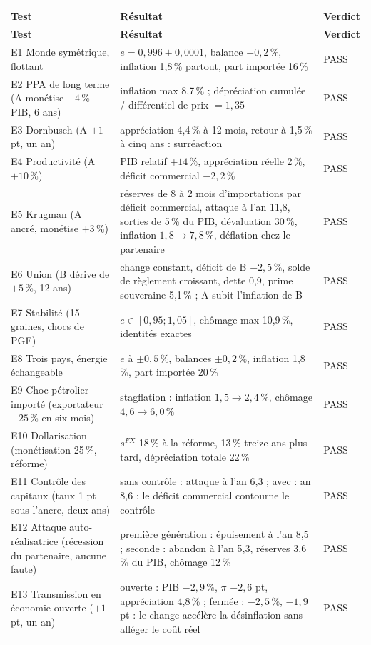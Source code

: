 \documentclass[11pt,a4paper]{article}
\begin{document}
\begin{center}\small
\begin{longtable}{p{4.4cm}p{8.0cm}p{1.4cm}}
\toprule
\textbf{Test} & \textbf{Résultat} & \textbf{Verdict}\\
\midrule
\endfirsthead
\toprule
\textbf{Test} & \textbf{Résultat} & \textbf{Verdict}\\
\midrule
\endhead
E1 Monde symétrique, flottant & $e=0{,}996\pm0{,}0001$, balance $-0{,}2\,\%$, inflation 1,8\,\% partout, part importée 16\,\% & PASS\\
E2 PPA de long terme (A monétise $+4\,\%$ PIB, 6 ans) & inflation max 8,7\,\% ; dépréciation cumulée / différentiel de prix $=1{,}35$ & PASS\\
E3 Dornbusch (A $+1$ pt, un an) & appréciation 4,4\,\% à 12 mois, retour à 1,5\,\% à cinq ans : surréaction & PASS\\
E4 Productivité (A $+10\,\%$) & PIB relatif $+14\,\%$, appréciation réelle 2\,\%, déficit commercial $-2{,}2\,\%$ & PASS\\
E5 Krugman (A ancré, monétise $+3\,\%$) & réserves de 8 à 2 mois d'importations par déficit commercial, attaque à l'an 11,8, sorties de 5\,\% du PIB, dévaluation 30\,\%, inflation $1{,}8\to7{,}8\,\%$, déflation chez le partenaire & PASS\\
E6 Union (B dérive de $+5\,\%$, 12 ans) & change constant, déficit de B $-2{,}5\,\%$, solde de règlement croissant, dette 0,9, prime souveraine 5,1\,\% ; A subit l'inflation de B & PASS\\
E7 Stabilité (15 graines, chocs de PGF) & $e\in[0{,}95;1{,}05]$, chômage max 10,9\,\%, identités exactes & PASS\\
E8 Trois pays, énergie échangeable & $e$ à $\pm0{,}5\,\%$, balances $\pm0{,}2\,\%$, inflation 1,8\,\%, part importée 20\,\% & PASS\\
E9 Choc pétrolier importé (exportateur $-25\,\%$ en six mois) & stagflation : inflation $1{,}5\to2{,}4\,\%$, chômage $4{,}6\to6{,}0\,\%$ & PASS\\
E10 Dollarisation (monétisation 25\,\%, réforme) & $s^{FX}$ 18\,\% à la réforme, 13\,\% treize ans plus tard, dépréciation totale 22\,\% & PASS\\
E11 Contrôle des capitaux (taux 1 pt sous l'ancre, deux ans) & sans contrôle : attaque à l'an 6,3 ; avec : an 8,6 ; le déficit commercial contourne le contrôle & PASS\\
E12 Attaque auto-réalisatrice (récession du partenaire, aucune faute) & première génération : épuisement à l'an 8,5 ; seconde : abandon à l'an 5,3, réserves 3,6\,\% du PIB, chômage 12\,\% & PASS\\
E13 Transmission en économie ouverte ($+1$ pt, un an) & ouverte : PIB $-2{,}9\,\%$, $\pi$ $-2{,}6$ pt, appréciation 4,8\,\% ; fermée : $-2{,}5\,\%$, $-1{,}9$ pt : le change accélère la désinflation sans alléger le coût réel & PASS\\
\bottomrule
\end{longtable}
\end{center}
\end{document}
